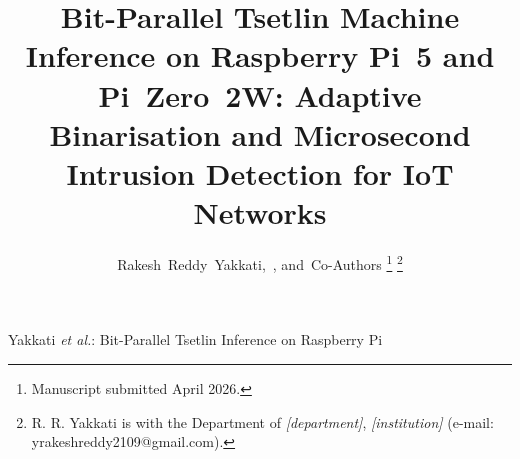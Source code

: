 \documentclass[journal,10pt]{IEEEtran}
\begin{document}
\title{Bit-Parallel Tsetlin Machine Inference on Raspberry Pi~5 and
       Pi~Zero~2W: Adaptive Binarisation and Microsecond Intrusion
       Detection for IoT Networks}

\author{Rakesh~Reddy~Yakkati,~,
        and~Co-Authors%
\thanks{Manuscript submitted April 2026.}%
\thanks{R. R. Yakkati is with the Department of \textit{[department]},
\textit{[institution]} (e-mail: yrakeshreddy2109@gmail.com).}}

%
         {Yakkati \MakeLowercase{\textit{et al.}}: Bit-Parallel Tsetlin
          Inference on Raspberry Pi}

\maketitle
\end{document}
